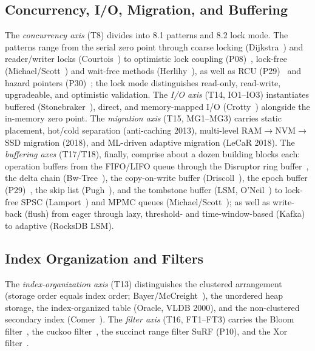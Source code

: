 \subsection{Concurrency, I/O, Migration, and Buffering}\label{ssec:sota-ax-conc}
The \emph{concurrency axis} (T8) divides into 8.1 patterns and 8.2 lock mode. The patterns range
from the serial zero point through coarse locking (Dijkstra~\cite{dijkstra1965concurrent}) and
reader/writer locks (Courtois~\cite{courtois1971readers}) to optimistic lock coupling
(P08)~\cite{leis2016olc}, lock-free (Michael/Scott~\cite{michael1996queue}) and wait-free methods
(Herlihy~\cite{herlihy1991waitfree}), as well as RCU (P29)~\cite{mckenney2001rcu} and hazard
pointers (P30)~\cite{michael2004hazard}; the lock mode distinguishes read-only, read-write,
upgradeable, and optimistic validation. The \emph{I/O axis} (T14, IO1--IO3) instantiates buffered
(Stonebraker~\cite{stonebraker1981os}), direct, and memory-mapped I/O (Crotty~\cite{crotty2022mmap})
alongside the in-memory zero point. The \emph{migration axis} (T15, MG1--MG3) carries static
placement, hot/cold separation (anti-caching 2013), multi-level RAM$\to$NVM$\to$SSD migration
(2018), and ML-driven adaptive migration (LeCaR 2018). The \emph{buffering axes} (T17/T18), finally,
comprise about a dozen building blocks each: operation buffers from the FIFO/LIFO queue through the
Disruptor ring buffer~\cite{thompson2011disruptor}, the delta chain
(Bw-Tree~\cite{levandoski2013bwtree}), the copy-on-write buffer
(Driscoll~\cite{driscoll1989persistent}), the epoch buffer (P29)~\cite{mckenney2001rcu}, the skip
list (Pugh~\cite{pugh1990skiplist}), and the tombstone buffer (LSM, O'Neil~\cite{oneil1996lsm}) to
lock-free SPSC (Lamport~\cite{lamport_spsc}) and MPMC queues
(Michael/Scott~\cite{michael1996queue}); as well as write-back (flush) from eager through lazy,
threshold- and time-window-based (Kafka) to adaptive (RocksDB LSM).

\subsection{Index Organization and Filters}\label{ssec:sota-ax-idx}
The \emph{index-organization axis} (T13) distinguishes the clustered arrangement (storage order
equals index order; Bayer/McCreight~\cite{bayer1972btree}), the unordered heap storage, the
index-organized table (Oracle, VLDB 2000), and the non-clustered secondary index
(Comer~\cite{comer1979btree}). The \emph{filter axis} (T16, FT1--FT3) carries the Bloom
filter~\cite{bloom1970}, the cuckoo filter~\cite{fan2014cuckoo}, the succinct range filter SuRF
(P10), and the Xor filter~\cite{graf2020xor}.

